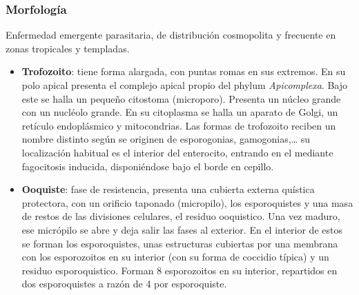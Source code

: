 \subsubsection{Morfología}
Enfermedad emergente parasitaria, de distribución cosmopolita y frecuente en zonas tropicales y templadas. 
\begin{itemize}[itemsep=0pt,parsep=0pt,topsep=0pt,partopsep=0pt]
	\item \textbf{Trofozoito}: tiene forma alargada, con puntas romas en sus extremos. En su polo apical presenta el complejo apical propio del phylum \textit{Apicomplexa}. Bajo este se halla un pequeño citostoma (microporo). Presenta un núcleo grande con un nucléolo grande. En su citoplasma se halla un aparato de Golgi, un retículo endoplásmico y mitocondrias. Las formas de trofozoito reciben un nombre distinto según se originen de esporogonias, gamogonias,… su localización habitual es el interior del enterocito, entrando en el mediante fagocitosis inducida, disponiéndose bajo el borde en cepillo.
	\item \textbf{Ooquiste}: fase de resistencia, presenta una cubierta externa quística protectora, con un orificio taponado (micropilo), los esporoquistes y una masa de restos de las divisiones celulares, el residuo ooquistico. Una vez maduro, ese micrópilo se abre y deja salir las fases al exterior. En el interior de estos se forman los esporoquistes, unas estructuras cubiertas por una membrana con los esporozoitos en su interior (con su forma de coccidio típica) y un residuo esporoquistico. Forman 8 esporozoitos en su interior, repartidos en dos esporoquistes a razón de 4 por esporoquiste.
\end{itemize}
